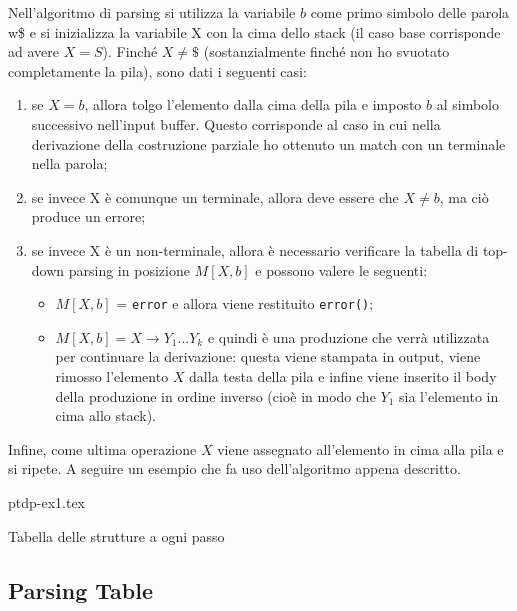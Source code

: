 \documentclass[class=book, crop=false, oneside, 12pt]{standalone}
\begin{document}
Nell'algoritmo di parsing si utilizza la variabile \(b\) come primo simbolo delle parola w\$ e si inizializza la variabile X con la cima dello stack (il caso base corrisponde ad avere \(X = S\)). Finché \(X \neq \$\) (sostanzialmente finché non ho svuotato completamente la pila), sono dati i seguenti casi:

\begin{enumerate}
    \item se \(X = b\), allora tolgo l'elemento dalla cima della pila e imposto \(b\) al simbolo successivo nell'input buffer. Questo corrisponde al caso in cui nella derivazione della costruzione parziale ho ottenuto un match con un terminale nella parola;
    \item se invece X è comunque un terminale, allora deve essere che \(X \neq b\), ma ciò produce un errore;
    \item se invece X è un non-terminale, allora è necessario verificare la tabella di top-down parsing in posizione \(M[X, b]\) e possono valere le seguenti:
    \begin{itemize}
        \item \(M[X, b]\) = \texttt{error} e allora viene restituito \texttt{error()};
        \item \(M[X, b] = X \rightarrow Y_1...Y_k\) e quindi è una produzione che verrà utilizzata per continuare la derivazione: questa viene stampata in output, viene rimosso l'elemento \(X\) dalla testa della pila e infine viene inserito il body della produzione in ordine inverso (cioè in modo che \(Y_1\) sia l'elemento in cima allo stack).
    \end{itemize}
\end{enumerate}

Infine, come ultima operazione \(X\) viene assegnato all'elemento in cima alla pila e si ripete. A seguire un esempio che fa uso dell'algoritmo appena descritto.
\begin{table}[H]
	\centering
	{ptdp-ex1.tex}
    \caption{Tabella delle strutture a ogni passo}
    \label{ptdp-ex1}
\end{table} 

\subsection{Parsing Table}
\end{document}
